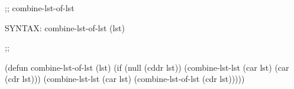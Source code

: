 \begin{aibox}{\function}
;; combine-lst-of-lst

SYNTAX: combine-lst-of-lst (lst)
\end{aibox}

\begin{aibox}{\examples}

\end{aibox}

\begin{aibox}{\comments}

\end{aibox}
\begin{aibox}{\answers}

\end{aibox}
\begin{aibox}{\othercomments}

\end{aibox}
\begin{aibox}{\pseudocode}

\end{aibox}
\begin{aibox}{\code}

;;%

(defun combine-lst-of-lst (lst)
	(if (null (cddr lst))
		(combine-lst-lst (car lst) (car (cdr lst)))
		(combine-lst-lst (car lst) (combine-lst-of-lst (cdr lst)))))
\end{aibox}
